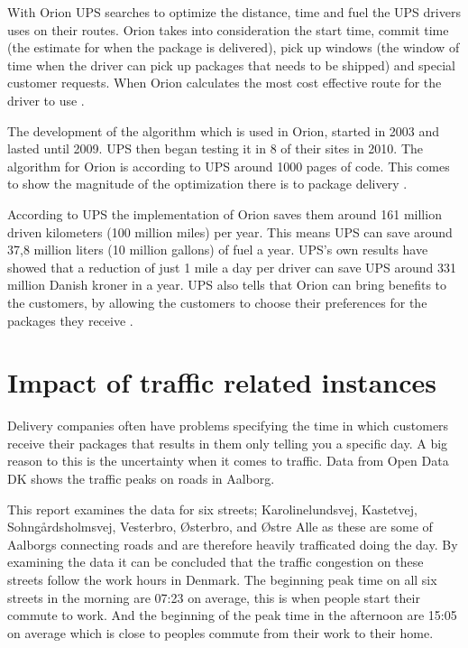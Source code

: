 \documentclass[12pt]{report}
\begin{document}
With Orion UPS searches to optimize the distance, time and fuel the UPS drivers uses on their routes. Orion takes into consideration the start time, commit time (the estimate for when the package is delivered), pick up windows (the window of time when the driver can pick up packages that needs to be shipped) and special customer requests. When Orion calculates the most cost effective route for the driver to use \cite{orionbackgrounder}.\hspace*{5mm}

The development of the algorithm which is used in Orion, started in 2003 and lasted until 2009. UPS then began testing it in 8 of their sites in 2010. The algorithm for Orion is according to UPS around 1000 pages of code. This comes to show the magnitude of the optimization there is to package delivery \cite{orionbackgrounder}.\hspace*{5mm}

According to UPS the implementation of Orion saves them around 161 million driven kilometers (100 million miles) per year. This means UPS can save around 37,8 million liters (10 million gallons) of fuel a year. UPS’s own results have showed that a reduction of just 1 mile a day per driver can save UPS around 331 million Danish kroner in a year. UPS also tells that Orion can bring benefits to the customers, by allowing the customers to choose their preferences for the packages they receive \cite{orionbackgrounder}.  

\section{Impact of traffic related instances}

Delivery companies often have problems specifying the time in which customers receive their packages that results in them only telling you a specific day. A big reason to this is the uncertainty when it comes to traffic. Data from Open Data DK shows the traffic peaks on roads in Aalborg\cite{traficcount}. 

This report examines the data for six streets; Karolinelundsvej, Kastetvej, Sohngårdsholmsvej, Vesterbro, Østerbro, and Østre Alle\cite{traficcount} as these are some of Aalborgs connecting roads and  are therefore heavily trafficated doing the day. By examining the data it can be concluded that the traffic congestion on these streets follow the work hours in Denmark. The beginning peak time on all six streets in the morning are 07:23 on average, this is when people start their commute to work. And the beginning of the peak time in the afternoon are 15:05 on average which is close to peoples commute from their work to their home.\hspace*{5mm}
\end{document}
